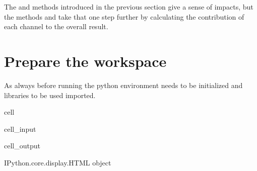 \documentclass[letterpaper,10pt,english]{jupyterBook}
\begin{document}
\sphinxAtStartPar
The  and  methods introduced in the previous section give a sense of impacts, but the  methods  and  take that one step further by calculating the  contribution of each channel to the overall result.


\section{Prepare the workspace}
\label{\detokenize{content/06_ModelAnalytics/AttributionSomeFeatures:prepare-the-workspace}}
\sphinxAtStartPar
As always before running  the python environment needs to be initialized and libraries to be used imported.

\begin{sphinxuseclass}{cell}\begin{sphinxVerbatimInput}

\begin{sphinxuseclass}{cell_input}
\begin{sphinxVerbatim}[commandchars=\\\{\}]
   

    


\end{sphinxVerbatim}

\end{sphinxuseclass}\end{sphinxVerbatimInput}
\begin{sphinxVerbatimOutput}

\begin{sphinxuseclass}{cell_output}
\begin{sphinxVerbatim}[commandchars=\\\{\}]
\PYGZlt{}IPython.core.display.HTML object\PYGZgt{}
\end{sphinxVerbatim}

\end{sphinxuseclass}\end{sphinxVerbatimOutput}

\end{sphinxuseclass}
\end{document}
